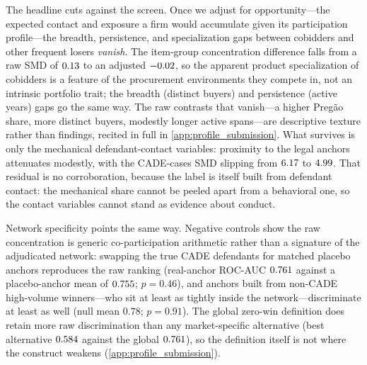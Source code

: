 The headline cuts against the screen. Once we adjust for
opportunity---the expected contact and exposure a firm would
accumulate given its participation profile---the breadth, persistence,
and specialization gaps between cobidders and other frequent losers
\emph{vanish}. The item-group concentration difference falls from a raw
SMD of $0.13$ to an adjusted $-0.02$, so
the apparent product specialization of cobidders is a feature of the
procurement environments they compete in, not an intrinsic portfolio
trait; the breadth (distinct buyers) and persistence (active years)
gaps go the same way. The raw contrasts that vanish---a higher Preg\~ao
share, more distinct buyers, modestly longer active spans---are
descriptive texture rather than findings, recited in full in
\ref{app:profile_submission}. What survives is only the mechanical
defendant-contact variables: proximity to the legal anchors attenuates
modestly, with the CADE-cases SMD slipping from $6.17$ to
$4.99$. That residual is no corroboration, because the
label is itself built from defendant contact: the mechanical share
cannot be peeled apart from a behavioral one, so the contact variables
cannot stand as evidence about conduct.

Network specificity points the same way. Negative controls show the
raw concentration is generic co-participation arithmetic rather than a
signature of the adjudicated network: swapping the true CADE defendants
for matched placebo anchors reproduces the raw ranking (real-anchor
ROC-AUC $0.761$ against a placebo-anchor mean of
$0.755$; $p=0.46$), and anchors built from non-CADE
high-volume winners---who sit at least as tightly inside the
network---discriminate at least as well (null mean $0.78$; $p=0.91$).
The global zero-win definition does retain more raw discrimination than
any market-specific alternative (best alternative
$0.584$ against the global $0.761$),
so the definition itself is not where the construct weakens
(\ref{app:profile_submission}).

